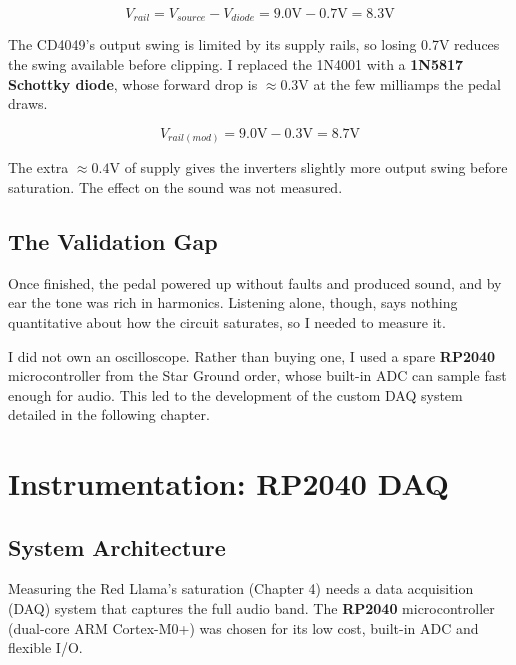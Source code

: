 \documentclass[11pt, a4paper]{report}
\begin{document}
\begin{equation}
  V_{rail} = V_{source} - V_{diode} = 9.0\text{V} - 0.7\text{V} = 8.3\text{V}
\end{equation}

The CD4049's output swing is limited by its supply rails, so losing 0.7V reduces the swing available before clipping. I replaced the 1N4001 with a \textbf{1N5817 Schottky diode}, whose forward drop is $\approx 0.3\text{V}$ at the few milliamps the pedal draws.\cite{diode_1n5817_datasheet}

\begin{equation}
  V_{rail(mod)} = 9.0\text{V} - 0.3\text{V} = 8.7\text{V}
\end{equation}

The extra $\approx 0.4\text{V}$ of supply gives the inverters slightly more output swing before saturation. The effect on the sound was not measured.

\section{The Validation Gap}
Once finished, the pedal powered up without faults and produced sound, and by ear the tone was rich in harmonics. Listening alone, though, says nothing quantitative about how the circuit saturates, so I needed to measure it.

I did not own an oscilloscope. Rather than buying one, I used a spare \textbf{RP2040} microcontroller from the Star Ground order, whose built-in ADC can sample fast enough for audio.\cite{raspberrypi_rp2040_datasheet} This led to the development of the custom DAQ system detailed in the following chapter.

\chapter{Instrumentation: RP2040 DAQ}

\section{System Architecture}
Measuring the Red Llama's saturation (Chapter 4) needs a data acquisition (DAQ) system that captures the full audio band. The \textbf{RP2040} microcontroller (dual-core ARM Cortex-M0+) was chosen for its low cost, built-in ADC and flexible I/O.\cite{rpi_rp2040_datasheet}
\end{document}
